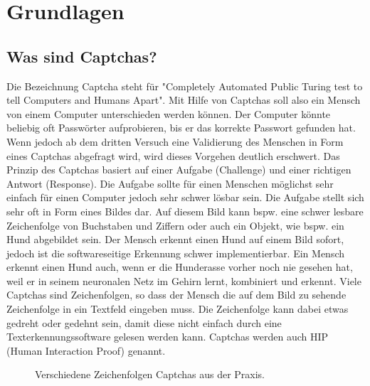 \section{Grundlagen}

\subsection{Was sind Captchas?}
Die Bezeichnung Captcha steht für "Completely Automated Public Turing test to tell Computers and Humans Apart". Mit Hilfe von Captchas soll also ein Mensch von einem Computer unterschieden werden können. Der Computer könnte  beliebig oft Passwörter aufprobieren, bis er das korrekte Passwort gefunden hat. Wenn jedoch ab dem dritten Versuch eine Validierung des Menschen in Form eines Captchas abgefragt wird, wird dieses Vorgehen deutlich erschwert. Das Prinzip des Captchas basiert auf einer Aufgabe (Challenge) und einer richtigen Antwort (Response). Die Aufgabe sollte für einen Menschen möglichst sehr einfach für einen Computer jedoch sehr schwer lösbar sein. Die Aufgabe stellt sich sehr oft in Form eines Bildes dar. Auf diesem Bild kann bspw. eine schwer lesbare Zeichenfolge von Buchstaben und Ziffern oder auch ein Objekt, wie bspw. ein Hund abgebildet sein. Der Mensch erkennt einen Hund auf einem Bild sofort, jedoch ist die softwareseitige Erkennung  schwer implementierbar. Ein Mensch erkennt einen Hund auch, wenn er die Hunderasse vorher noch nie gesehen hat, weil er in seinem neuronalen Netz im Gehirn lernt, kombiniert und erkennt. Viele Captchas sind Zeichenfolgen, so dass der Mensch die auf dem Bild zu sehende Zeichenfolge in ein Textfeld eingeben muss. Die Zeichenfolge kann dabei etwas gedreht oder gedehnt sein, damit diese nicht einfach durch eine Texterkennungssoftware gelesen werden kann. Captchas werden auch HIP (Human Interaction Proof) genannt.

\begin{figure}[htbp]
  \centering
  \caption{Verschiedene Zeichenfolgen Captchas aus der Praxis.}
  \label{Captchas}
\end{figure}

